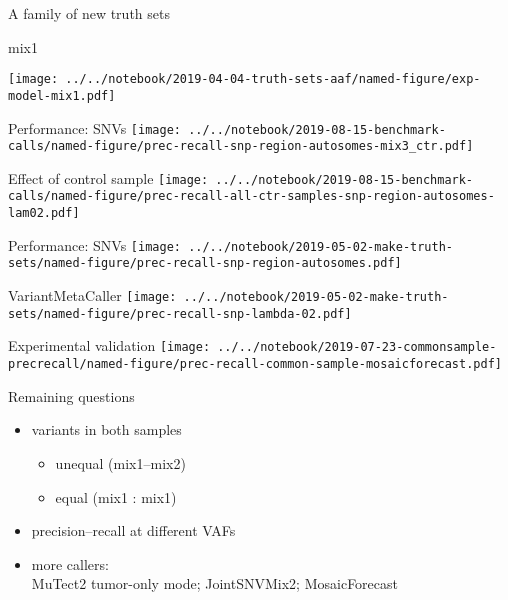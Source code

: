 \documentclass{beamer}
\begin{document}
\begin{frame}{A family of new truth sets}
\begin{center}
\large mix1
\end{center}

\texttt{[image: ../../notebook/2019-04-04-truth-sets-aaf/named-figure/exp-model-mix1.pdf]}
\end{frame}



\begin{frame}{Performance: SNVs}
\texttt{[image: ../../notebook/2019-08-15-benchmark-calls/named-figure/prec-recall-snp-region-autosomes-mix3\_ctr.pdf]}
\end{frame}

\begin{frame}{Effect of control sample}
\texttt{[image: ../../notebook/2019-08-15-benchmark-calls/named-figure/prec-recall-all-ctr-samples-snp-region-autosomes-lam02.pdf]}
\end{frame}

\begin{frame}{Performance: SNVs}
\texttt{[image: ../../notebook/2019-05-02-make-truth-sets/named-figure/prec-recall-snp-region-autosomes.pdf]}
\end{frame}

\begin{frame}[plain]{VariantMetaCaller}
\texttt{[image: ../../notebook/2019-05-02-make-truth-sets/named-figure/prec-recall-snp-lambda-02.pdf]}
\end{frame}


\begin{frame}{Experimental validation}
\texttt{[image: ../../notebook/2019-07-23-commonsample-precrecall/named-figure/prec-recall-common-sample-mosaicforecast.pdf]}
\end{frame}

\begin{frame}{Remaining questions}
\begin{itemize}
\item variants in both samples
\begin{itemize}
\item unequal (mix1--mix2)
\item equal (mix1 : mix1)
\end{itemize}
\item precision--recall at different VAFs
\item more callers:\\MuTect2 tumor-only mode; JointSNVMix2; MosaicForecast
\end{itemize}
\end{frame}
\end{document}

